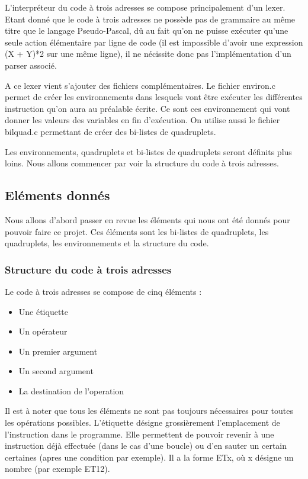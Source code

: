 \documentclass{article}
\begin{document}
L'interpréteur du code à trois adresses se compose principalement d'un lexer. Etant donné que le code à trois adresses ne possède pas de grammaire au même titre que le langage Pseudo-Pascal,
dû au fait qu'on ne puisse exécuter qu'une seule action élémentaire par ligne de code (il est impossible d'avoir une expression (X + Y)*2 sur une même ligne), il ne nécissite donc pas l'implémentation d'un parser associé.

A ce lexer vient s'ajouter des fichiers complémentaires. Le fichier environ.c permet de créer les environnements dans lesquels vont être exécuter les différentes instruction qu'on aura au préalable écrite. Ce sont ces environnement qui vont donner les valeurs des variables en fin d'exécution.
On utilise aussi le fichier bilquad.c permettant de créer des bi-listes de quadruplets.

Les environnements, quadruplets et bi-listes de quadruplets seront définits plus loins. Nous allons commencer par voir la structure du code à trois adresses.


\subsection{Eléments donnés}
Nous allons d'abord passer en revue les éléments qui nous ont été donnés pour pouvoir faire ce projet. Ces éléments sont les bi-listes de quadruplets, les quadruplets, les environnements et la structure du code.
\subsubsection{Structure du code à trois adresses}

Le code à trois adresses se compose de cinq éléments :
\begin{itemize}
\item Une étiquette
\item Un opérateur
\item Un premier argument
\item Un second argument
\item La destination de l'operation
\end{itemize}

Il est à noter que tous les éléments ne sont pas toujours nécessaires pour toutes les opérations possibles.
\medbreak
L'étiquette désigne grossièrement l'emplacement de l'instruction dans le programme. Elle permettent de pouvoir revenir à une instruction déjà effectuée (dans le cas d'une boucle) ou d'en sauter un certain certaines (apres une condition par exemple). Il a la forme ETx, où x désigne un nombre (par exemple ET12).
\end{document}
